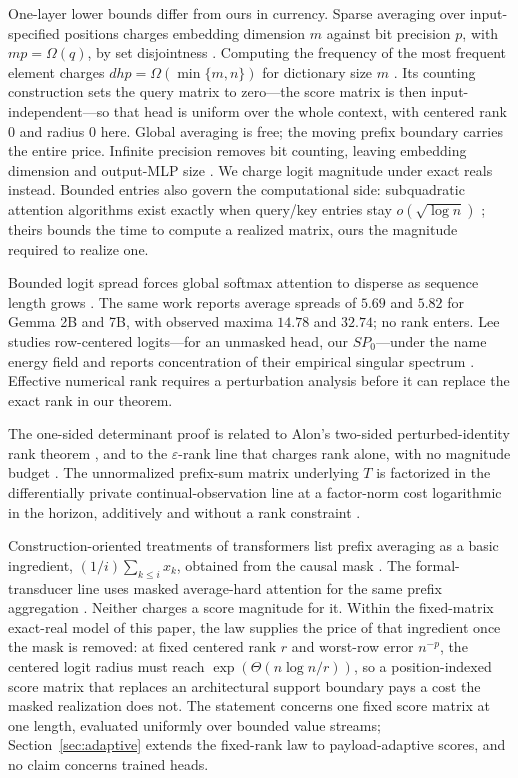 \documentclass[10pt]{article}
\theoremstyle{definition}
\begin{document}
One-layer lower bounds differ from ours in currency.  Sparse averaging over
input-specified positions charges embedding dimension \(m\) against bit
precision \(p\), with \(mp=\Omega(q)\), by set disjointness
\cite{sanford2023}.  Computing the frequency of the most frequent element charges
\(dhp=\Omega(\min\{m,n\})\) for dictionary size \(m\)
\cite{yehudai2024count}.  Its counting construction sets the query matrix to
zero---the score matrix is then input-independent---so that head is uniform
over the whole context, with centered rank \(0\) and radius \(0\) here.
Global averaging is free; the moving prefix boundary carries the entire
price.  Infinite precision removes bit counting, leaving embedding dimension
and output-MLP size \cite{kozachinskiy2024}.  We charge logit magnitude under
exact reals instead.  Bounded entries also govern the computational side:
subquadratic attention algorithms exist exactly when query/key entries stay
\(o(\sqrt{\log n})\) \cite{alman2023}; theirs bounds the time to compute a
realized matrix, ours the magnitude required to realize one.

Bounded logit spread forces global softmax attention to disperse as sequence
length grows \cite{velickovic2025}.  The same work reports average spreads
of \(5.69\) and \(5.82\) for Gemma 2B and 7B, with observed maxima \(14.78\)
and \(32.74\); no rank enters.  Lee studies row-centered logits---for an
unmasked head, our \(SP_0\)---under the name energy field and reports
concentration of their empirical singular spectrum \cite{lee2026}.  Effective
numerical rank requires a perturbation analysis before it can replace the
exact rank in our theorem.

The one-sided determinant proof is related to Alon's two-sided
perturbed-identity rank theorem \cite{alon2009}, and to the
\(\varepsilon\)-rank line that charges rank alone, with no magnitude budget
\cite{alon2013approx}.  The unnormalized prefix-sum matrix underlying \(T\)
is factorized in the differentially private continual-observation line at a
factor-norm cost logarithmic in the horizon, additively and without a rank
constraint \cite{fichtenberger2023}.

Construction-oriented treatments of transformers list prefix averaging as a
basic ingredient, \((1/i)\sum_{k\le i}x_k\), obtained from the causal mask
\cite{yang2025cookbook}.  The formal-transducer line uses masked
average-hard attention for the same prefix aggregation \cite{strobl2025}.
Neither charges a score magnitude for it.  Within the fixed-matrix exact-real
model of this paper, the law supplies the price of that ingredient once the
mask is removed: at fixed centered rank \(r\) and worst-row error \(n^{-p}\),
the centered logit radius must reach \(\exp(\Theta(n\log n/r))\), so a
position-indexed score matrix that replaces an architectural support boundary
pays a cost the masked realization does not.  The statement concerns one
fixed score matrix at one length, evaluated uniformly over bounded value
streams; Section~\ref{sec:adaptive} extends the fixed-rank law to
payload-adaptive scores, and no claim concerns trained heads.
\end{document}

